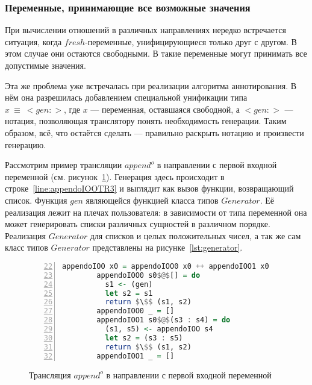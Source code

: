 
\subsubsection{Переменные, принимающие все возможные значения}

При вычислении отношений в различных направлениях нередко встречается ситуация, когда $fresh$-переменные, унифицирующиеся только друг с другом.
В этом случае они остаются свободными.
В \miniKanren{} такие переменные могут принимать все допустимые значения.

Эта же проблема уже встречалась при реализации алгоритма аннотирования.
В нём она разрешилась добавлением специальной унификации типа $x~\equiv~<gen:>$, где $x$ --- переменная, оставшаяся свободной, а $<gen:>$ --- нотация, позволяющая транслятору понять необходимость генерации.
Таким образом, всё, что остаётся сделать --- правильно раскрыть нотацию и произвести генерацию.

Рассмотрим пример трансляции $append^o$ в направлении с первой входной переменной (см. рисунок~\ref{lst:appendoIOOTR}).
Генерация здесь происходит в строке~\ref{line:appendoIOOTR3} и выглядит как вызов функции, возвращающий список.
Функция $gen$ являющейся функцией класса типов $Generator$.
Её реализация лежит на плечах пользователя: в зависимости от типа переменной она может генерировать списки различных сущностей в различном порядке.
Реализация $Generator$ для списков и целых положительных чисел, а так же сам класс типов $Generator$ представлены на рисунке~\ref{lst:generator}.

\begin{figure}[h!]
  \begin{center}
  \begin{minipage}{0.7\textwidth}
  \begin{lstlisting}[language=Haskell, frame=single, numbers=left,numberstyle=\small, firstnumber=22, escapechar=|]
        appendoIOO x0 = appendoIOO0 x0 ++ appendoIOO1 x0
        appendoIOO0 s0$@$[] = do
          s1 <- (gen)                                    |\label{line:appendoIOOTR3}|
          let s2 = s1                                    
          return $\$$ (s1, s2)
        appendoIOO0 _ = []
        appendoIOO1 s0$@$(s3 : s4) = do
          (s1, s5) <- appendoIOO s4
          let s2 = (s3 : s5)
          return $\$$ (s1, s2)
        appendoIOO1 _ = []
    \end{lstlisting}
  \end{minipage}
  \end{center}
  \caption{Трансляция $append^o$ в направлении с первой входной переменной}
  \label{lst:appendoIOOTR}
\end{figure}

